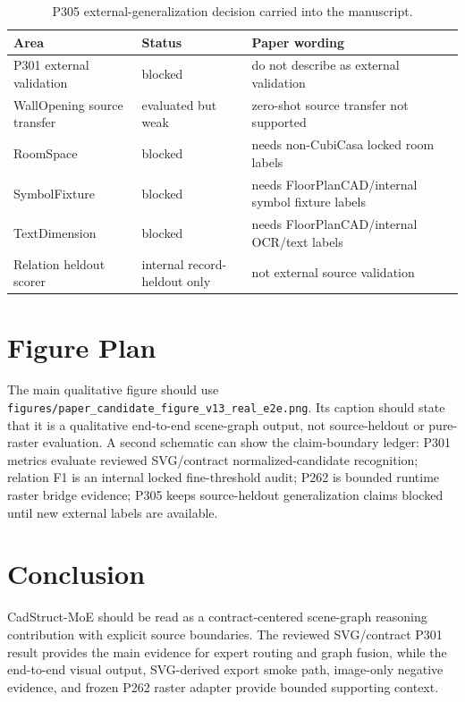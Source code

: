 \documentclass[11pt]{article}
\begin{document}
\begin{table}[t]
\centering
\small
\caption{P305 external-generalization decision carried into the manuscript.}
\label{tab:p305_external_generalization}
\begin{tabular}{lll}
\toprule
Area & Status & Paper wording \\
\midrule
P301 external validation & blocked & do not describe as external validation \\
WallOpening source transfer & evaluated but weak & zero-shot source transfer not supported \\
RoomSpace & blocked & needs non-CubiCasa locked room labels \\
SymbolFixture & blocked & needs FloorPlanCAD/internal symbol fixture labels \\
TextDimension & blocked & needs FloorPlanCAD/internal OCR/text labels \\
Relation heldout scorer & internal record-heldout only & not external source validation \\
\bottomrule
\end{tabular}
\end{table}

\section{Figure Plan}
The main qualitative figure should use \texttt{figures/paper\_candidate\_figure\_v13\_real\_e2e.png}. Its caption should state that it is a qualitative end-to-end scene-graph output, not source-heldout or pure-raster evaluation. A second schematic can show the claim-boundary ledger: P301 metrics evaluate reviewed SVG/contract normalized-candidate recognition; relation F1 is an internal locked fine-threshold audit; P262 is bounded runtime raster bridge evidence; P305 keeps source-heldout generalization claims blocked until new external labels are available.

\section{Conclusion}
CadStruct-MoE should be read as a contract-centered scene-graph reasoning contribution with explicit source boundaries. The reviewed SVG/contract P301 result provides the main evidence for expert routing and graph fusion, while the end-to-end visual output, SVG-derived export smoke path, image-only negative evidence, and frozen P262 raster adapter provide bounded supporting context.
\end{document}
